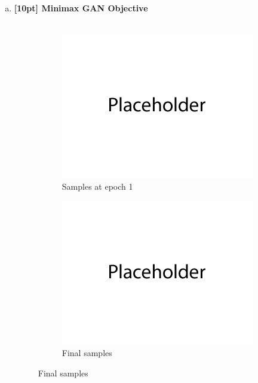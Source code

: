 \documentclass{article}
\begin{document}
\begin{enumerate}[(a)]
\item {\bf [10pt] Minimax GAN Objective} \\\\
\begin{figure}[H]
    \centering
    \begin{subfigure}{0.45\textwidth}
        \centering
        \includegraphics[width=\textwidth]{figures/q1b_epoch1.png}
        \caption{Samples at epoch 1}
    \end{subfigure}
    \begin{subfigure}{0.45\textwidth}
        \centering
        \includegraphics[width=\textwidth]{figures/q1b_final.png}
        \caption{Final samples}
    \end{subfigure}

\end{figure}
\end{enumerate}
\end{document}
